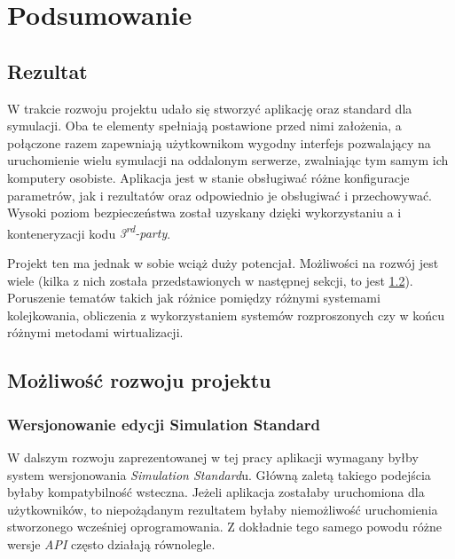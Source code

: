 \chapter{Podsumowanie}
\label{cha:podsumowanie}

\section{Rezultat}

\par W trakcie rozwoju projektu udało się stworzyć aplikację oraz standard dla symulacji. Oba te elementy spełniają postawione przed nimi założenia, a połączone razem zapewniają użytkownikom wygodny interfejs pozwalający na uruchomienie wielu symulacji na oddalonym serwerze, zwalniając tym samym ich komputery osobiste. Aplikacja jest w stanie obsługiwać różne konfiguracje parametrów, jak i rezultatów oraz odpowiednio je obsługiwać i przechowywać. Wysoki poziom bezpieczeństwa został uzyskany dzięki wykorzystaniu \emph{\docker}a i konteneryzacji kodu \emph{3\textsuperscript{rd}-party}.

\par Projekt ten ma jednak w sobie wciąż duży potencjał. Możliwości na rozwój jest wiele (kilka z nich została przedstawionych w następnej sekcji, to jest \ref{sec:mozliwyDalszyRozwoj}). Poruszenie tematów takich jak różnice pomiędzy różnymi systemami kolejkowania, obliczenia z wykorzystaniem systemów rozproszonych czy w końcu różnymi metodami wirtualizacji.

\section{Możliwość rozwoju projektu}
\label{sec:mozliwyDalszyRozwoj}

\subsection{Wersjonowanie edycji Simulation Standard}

\par W dalszym rozwoju zaprezentowanej w tej pracy aplikacji wymagany byłby system wersjonowania \emph{Simulation Standard}u. Główną zaletą takiego podejścia byłaby kompatybilność wsteczna. Jeżeli aplikacja zostałaby uruchomiona dla użytkowników, to niepożądanym rezultatem byłaby niemożliwość uruchomienia stworzonego wcześniej oprogramowania. Z dokładnie tego samego powodu różne wersje \emph{API} często działają równolegle.

